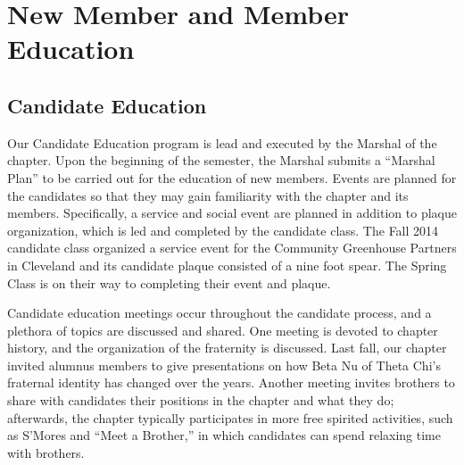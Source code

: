 \chapter{New Member and Member Education}

  \section*{Candidate Education}
    Our Candidate Education program is lead and executed by the Marshal of the chapter. Upon the beginning of the semester, the Marshal submits a ``Marshal Plan'' to be carried out for the education of new members. Events are planned for the candidates so that they may gain familiarity with the chapter and its members. Specifically, a service and social event are planned in addition to plaque organization, which is led and completed by the candidate class. The Fall 2014 candidate class organized a service event for the Community Greenhouse Partners in Cleveland and its candidate plaque consisted of a nine foot spear. The Spring Class is on their way to completing their event and plaque.
  
    Candidate education meetings occur throughout the candidate process, and a plethora of topics are discussed and shared. One meeting is devoted to chapter history, and the organization of the fraternity is discussed. Last fall, our chapter invited alumnus members to give presentations on how Beta Nu of Theta Chi's fraternal identity has changed over the years. Another meeting invites brothers to share with candidates their positions in the chapter and what they do; afterwards, the chapter typically participates in more free spirited activities, such as S'Mores and ``Meet a Brother,'' in which candidates can spend relaxing time with brothers. 

